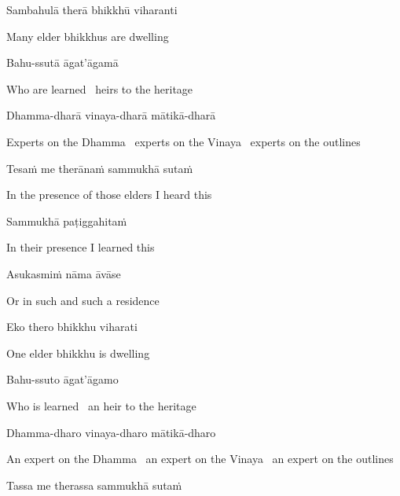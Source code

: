 Sambahulā therā bhikkhū viharanti

\begin{english}
  Many elder bhikkhus are dwelling
\end{english}

Bahu-ssutā āgat'āgamā

\begin{english}
  Who are learned \breathmark\ heirs to the heritage
\end{english}

Dhamma-dharā vinaya-dharā mātikā-dharā

\begin{english-hang}
  Experts on the Dhamma \breathmark\ experts on the Vinaya \breathmark\ experts on the outlines
\end{english-hang}

Tesaṁ me therānaṁ sammukhā sutaṁ

\begin{english}
  In the presence of those elders I heard this
\end{english}

Sammukhā paṭiggahitaṁ

\begin{english}
  In their presence I learned this
\end{english}

Asukasmiṁ nāma āvāse

\begin{english}
  Or in such and such a residence
\end{english}

Eko thero bhikkhu viharati

\begin{english}
  One elder bhikkhu is dwelling
\end{english}

\ifninebythirteen\clearpage\fi

Bahu-ssuto āgat'āgamo

\begin{english}
  Who is learned \breathmark\ an heir to the heritage
\end{english}

Dhamma-dharo vinaya-dharo mātikā-dharo

\begin{english-hang}
  An expert on the Dhamma \breathmark\ an expert on the Vinaya \breathmark\ an expert on the outlines
\end{english-hang}

Tassa me therassa sammukhā sutaṁ

